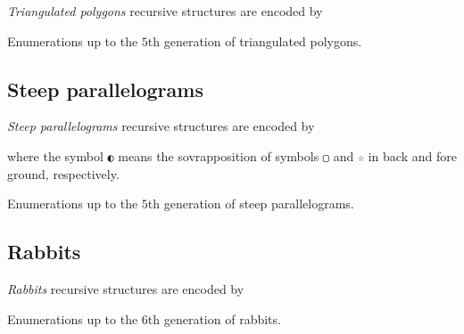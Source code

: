 \textit{Triangulated polygons} recursive structures are encoded by

\begin{margintable}
\caption{Enumerations up to the $5$th generation of triangulated polygons.}
\end{margintable}


\newpage
\subsection{Steep parallelograms}

\textit{Steep parallelograms} recursive structures are encoded by

\begin{margintable}
where the symbol \verb|◐| means the sovrapposition of symbols \verb|▢| and
\verb|☆| in back and fore ground, respectively.
\caption{Enumerations up to the $5$th generation of steep parallelograms.}
\end{margintable}


\newpage
\subsection{Rabbits}

\textit{Rabbits} recursive structures are encoded by

\begin{margintable}
\caption{Enumerations up to the $6$th generation of rabbits.}
\end{margintable}


